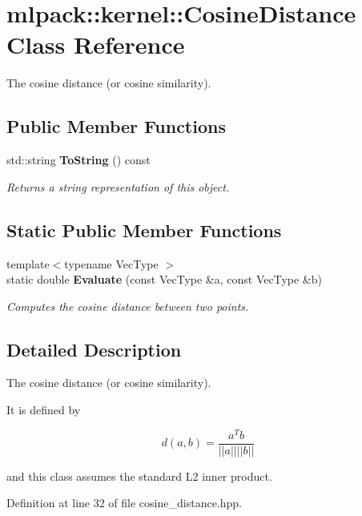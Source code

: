 \section{mlpack\-:\-:kernel\-:\-:Cosine\-Distance Class Reference}
\label{classmlpack_1_1kernel_1_1CosineDistance}


The cosine distance (or cosine similarity).  


\subsection*{Public Member Functions}
\begin{DoxyCompactItemize}
\item 
std\-::string {\bf To\-String} () const 
\begin{DoxyCompactList}\small\item\em Returns a string representation of this object. \end{DoxyCompactList}\end{DoxyCompactItemize}
\subsection*{Static Public Member Functions}
\begin{DoxyCompactItemize}
\item 
{\footnotesize template$<$typename Vec\-Type $>$ }\\static double {\bf Evaluate} (const Vec\-Type \&a, const Vec\-Type \&b)
\begin{DoxyCompactList}\small\item\em Computes the cosine distance between two points. \end{DoxyCompactList}\end{DoxyCompactItemize}


\subsection{Detailed Description}
The cosine distance (or cosine similarity). 

It is defined by

\[ d(a, b) = \frac{a^T b}{|| a || || b ||} \]

and this class assumes the standard L2 inner product. 

Definition at line 32 of file cosine\-\_\-distance.\-hpp.




